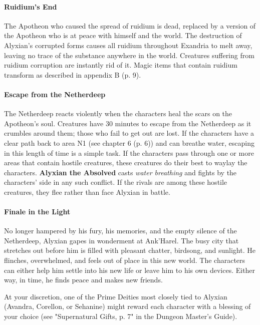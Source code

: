 \documentclass[a4paper, 11pt, bg=full, twocolumn, nooutline]{dndbook}
\begin{document}
\paragraph{Ruidium's End}

The Apotheon who caused the spread of ruidium is dead, replaced by a version of the Apotheon who is at peace with himself and the world. The destruction of Alyxian's corrupted forms causes all ruidium throughout Exandria to melt away, leaving no trace of the substance anywhere in the world. Creatures suffering from ruidium corruption are instantly rid of it. Magic items that contain ruidium transform as described in appendix B (p. 9).

\paragraph{Escape from the Netherdeep}

The Netherdeep reacts violently when the characters heal the scars on the Apotheon's soul. Creatures have 30 minutes to escape from the Netherdeep as it crumbles around them; those who fail to get out are lost. If the characters have a clear path back to area N1 (see chapter 6 (p. 6)) and can breathe water, escaping in this length of time is a simple task. If the characters pass through one or more areas that contain hostile creatures, these creatures do their best to waylay the characters. \textbf{Alyxian the Absolved} casts \textit{water breathing} and fights by the characters' side in any such conflict. If the rivals are among these hostile creatures, they flee rather than face Alyxian in battle.

\paragraph{Finale in the Light}

No longer hampered by his fury, his memories, and the empty silence of the Netherdeep, Alyxian gapes in wonderment at Ank'Harel. The busy city that stretches out before him is filled with pleasant chatter, birdsong, and sunlight. He flinches, overwhelmed, and feels out of place in this new world. The characters can either help him settle into his new life or leave him to his own devices. Either way, in time, he finds peace and makes new friends.

At your discretion, one of the Prime Deities most closely tied to Alyxian (Avandra, Corellon, or Sehanine) might reward each character with a blessing of your choice (see "Supernatural Gifts, p. 7" in the Dungeon Master's Guide).
\end{document}
